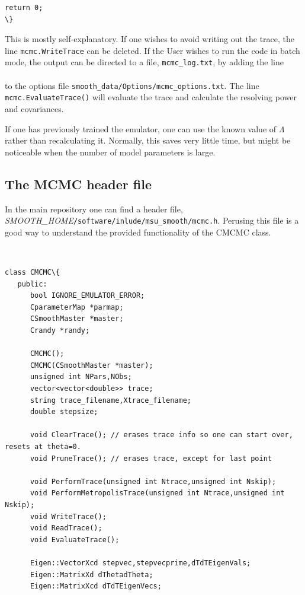 \documentclass[UserManual.tex]{subfiles}
\begin{document}
\begin{sloppypar}
{\begin{Verbatim}[commandchars=\\\{\}]
   return 0;
\}
\end{Verbatim}
}

This is mostly self-explanatory. If one wishes to avoid writing out the trace, the line {\tt mcmc.WriteTrace} can be deleted. If the User wishes to run the code in batch mode, the output can be directed to a file, {\tt mcmc\_log.txt}, by adding the line\\
\hspace*{20pt}{\tt LogFileName mcmc\_log.txt} \\
to the options file {\tt smooth\_data/Options/mcmc\_options.txt}. The line {\tt mcmc.EvaluateTrace()} will evaluate the trace and calculate the resolving power and covariances.

If one has previously trained the emulator, one can use the known value of $\Lambda$ rather than recalculating it. Normally, this saves very little time, but might be noticeable when the number of model parameters is large.

\subsection{The MCMC header file}

In the main repository one can find a header file, \textit{SMOOTH\_HOME}{\tt /software/inlude/msu\_smooth/mcmc.h}. Perusing this file is a good way to understand the provided functionality of the CMCMC class. 
{\tt
\begin{Verbatim}[commandchars=\\\{\}]
class CMCMC\{
   public:
      bool IGNORE_EMULATOR_ERROR;
      CparameterMap *parmap;
      CSmoothMaster *master;
      Crandy *randy;
      
      CMCMC();
      CMCMC(CSmoothMaster *master);
      unsigned int NPars,NObs;
      vector<vector<double>> trace;
      string trace_filename,Xtrace_filename;
      double stepsize;
      
      void ClearTrace(); // erases trace info so one can start over, resets at theta=0.
      void PruneTrace(); // erases trace, except for last point
      
      void PerformTrace(unsigned int Ntrace,unsigned int Nskip);
      void PerformMetropolisTrace(unsigned int Ntrace,unsigned int Nskip);
      void WriteTrace();
      void ReadTrace();
      void EvaluateTrace();
      
      Eigen::VectorXcd stepvec,stepvecprime,dTdTEigenVals;
      Eigen::MatrixXd dThetadTheta;
      Eigen::MatrixXcd dTdTEigenVecs;


\end{Verbatim}}
\end{sloppypar}
\end{document}
